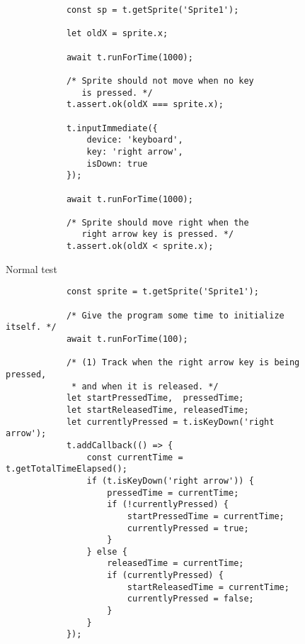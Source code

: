 \begin{listing}[ht]
    \centering
    \begin{subfigure}[b]{.35\textwidth}
        \centering
        \begin{verbatim}
            const sp = t.getSprite('Sprite1');

            let oldX = sprite.x;

            await t.runForTime(1000);

            /* Sprite should not move when no key
               is pressed. */
            t.assert.ok(oldX === sprite.x);

            t.inputImmediate({
                device: 'keyboard',
                key: 'right arrow',
                isDown: true
            });

            await t.runForTime(1000);

            /* Sprite should move right when the
               right arrow key is pressed. */
            t.assert.ok(oldX < sprite.x);
        \end{verbatim}
        \caption{Normal test}
    \end{subfigure}
    \hspace{.08\textwidth}
    \begin{subfigure}[b]{.55\textwidth}
        \centering
        \begin{verbatim}
            const sprite = t.getSprite('Sprite1');

            /* Give the program some time to initialize itself. */
            await t.runForTime(100);

            /* (1) Track when the right arrow key is being pressed,
             * and when it is released. */
            let startPressedTime,  pressedTime;
            let startReleasedTime, releasedTime;
            let currentlyPressed = t.isKeyDown('right arrow');
            t.addCallback(() => {
                const currentTime = t.getTotalTimeElapsed();
                if (t.isKeyDown('right arrow')) {
                    pressedTime = currentTime;
                    if (!currentlyPressed) {
                        startPressedTime = currentTime;
                        currentlyPressed = true;
                    }
                } else {
                    releasedTime = currentTime;
                    if (currentlyPressed) {
                        startReleasedTime = currentTime;
                        currentlyPressed = false;
                    }
                }
            });


\end{verbatim}
\end{subfigure}
\end{listing}
